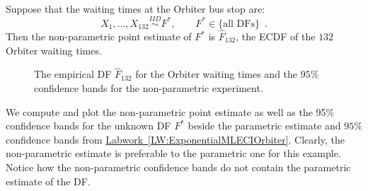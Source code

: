 \begin{labwork}\label{LW:OrbiterECDFsConfBands}
Suppose that the waiting times at the Orbiter bus stop are:
$$X_1,\ldots,X_{132} \overset{IID}{\sim} F^*, \qquad F^* \in \{ \text{all DFs} \} \enspace .$$
Then the non-parametric point estimate of $F^*$ is $\widehat{F}_{132}$, the ECDF of the $132$ Orbiter waiting times.
\begin{figure}[htpb]
\caption{The empirical DF $\widehat{F}_{132}$ for the Orbiter waiting times and the $95\%$ confidence bands for the non-parametric experiment.  \label{F:OrbiterECDFsConfBands}}
\centering   {}
\end{figure}
We compute and plot the non-parametric point estimate as well as the 95\% confidence bands for the unknown DF $F^*$ beside the parametric estimate and $95\%$ confidence bands from \hyperref[LW:ExponentialMLECIOrbiter]{Labwork~\ref*{LW:ExponentialMLECIOrbiter}}.  Clearly, the non-parametric estimate is preferable to the parametric one for this example.  Notice how the non-parametric confidence bands do not contain the parametric estimate of the DF. 
\end{labwork}


